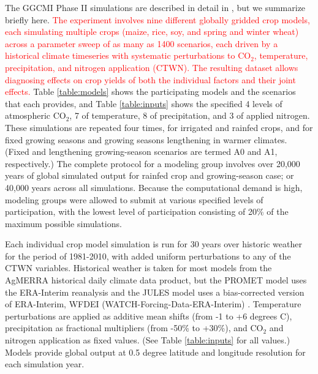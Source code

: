 \documentclass[gmd, manuscript]{copernicus} %
\begin{document}
The GGCMI Phase II simulations %
are described in detail in \citet{Franke2019a}, but we summarize briefly here. 
\textcolor{red}{The experiment involves nine different globally gridded crop models, each simulating multiple crops (maize, rice, soy, and spring and winter wheat) across a parameter sweep of as many as 1400 scenarios, each driven by a historical climate timeseries with systematic perturbations to CO$_2$, temperature, precipitation, and nitrogen application (CTWN). 
The resulting dataset allows diagnosing effects on crop yields of both the individual factors and their joint effects.}
Table \ref{table:models} shows the participating models and the scenarios that each provides, and Table \ref{table:inputs} shows the specified 4 levels of atmospheric CO$_2$, 7 of temperature, 8 of precipitation, and 3 of applied nitrogen. 
These simulations are repeated four times, for irrigated and rainfed crops, and for fixed growing seasons and growing seasons lengthening in warmer climates. 
(Fixed and lengthening growing-season scenarios are termed A0 and A1, respectively.) 
The complete protocol for a modeling group involves over 20,000 years of global simulated output for rainfed crop and growing-season case; or 40,000 years across all simulations. 
Because the computational demand is high, modeling groups were allowed to submit at various specified levels of participation, with the lowest level of participation consisting of 20\% of the maximum possible simulations.

Each individual crop model simulation is run for 30 years over historic weather for the period of 1981-2010, with added uniform perturbations to any of the CTWN variables.
Historical weather is taken for most models from the AgMERRA \citep{Ruane2015} historical daily climate data product, but the PROMET model uses the ERA-Interim reanalysis \citep{dee2011era} and the JULES model uses a bias-corrected version of ERA-Interim, WFDEI (WATCH-Forcing-Data-ERA-Interim) \citep{weedon2014wfdei}. 
Temperature perturbations are applied as additive mean shifts (from -1 to +6 degrees C), precipitation as fractional multipliers (from -50\% to +30\%), and CO$_2$ and nitrogen application as fixed values. (See Table \ref{table:inputs} for all values.)
Models provide global output at 0.5 degree latitude and longitude resolution for each simulation year.

\end{document}
